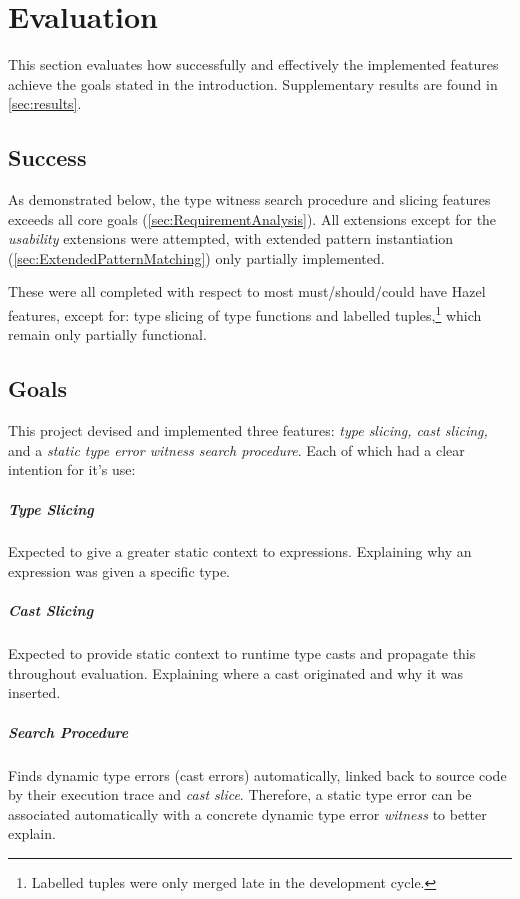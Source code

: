 \chapter{Evaluation}\label{chap:Evaluation}
This section evaluates how successfully and effectively the implemented features achieve the goals stated in the introduction. Supplementary results are found in \cref{sec:results}.

\section{Success}
As demonstrated below, the type witness search procedure and slicing features exceeds all core goals (\cref{sec:RequirementAnalysis}). All extensions except for the \textit{usability} extensions were attempted, with extended pattern instantiation (\cref{sec:ExtendedPatternMatching}) only partially implemented.

These were all completed with respect to most must/should/could have Hazel features, except for: type slicing of type functions and labelled tuples,\footnote{Labelled tuples were only merged late in the development cycle.} which remain only partially functional. 

\section{Goals}\label{sec:EvaluationGoals}
This project devised and implemented three features: \textit{type slicing, cast slicing,} and a \textit{static type error witness search procedure}. Each of which had a clear intention for it's use:

\paragraph{Type Slicing} Expected to give a greater static context to expressions. Explaining why an expression was given a specific type.

\paragraph{Cast Slicing} Expected to provide static context to runtime type casts and propagate this throughout evaluation. Explaining where a cast originated and why it was inserted.

\paragraph{Search Procedure} Finds dynamic type errors (cast errors) automatically, linked back to source code by their execution trace and \textit{cast slice}. Therefore, a static type error can be associated automatically with a concrete dynamic type error \textit{witness} to better explain.

